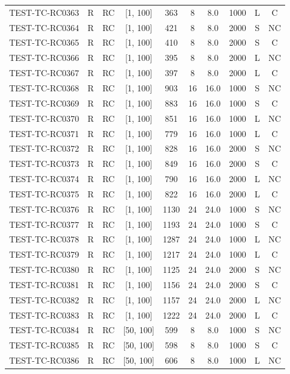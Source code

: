 \begin{longtable}{lccccccccc}
TEST-TC-RC0363 & R & RC & [1, 100] & 363 & 8 & 8.0 & 1000 & L & C \\
TEST-TC-RC0364 & R & RC & [1, 100] & 421 & 8 & 8.0 & 2000 & S & NC \\
TEST-TC-RC0365 & R & RC & [1, 100] & 410 & 8 & 8.0 & 2000 & S & C \\
TEST-TC-RC0366 & R & RC & [1, 100] & 395 & 8 & 8.0 & 2000 & L & NC \\
TEST-TC-RC0367 & R & RC & [1, 100] & 397 & 8 & 8.0 & 2000 & L & C \\
TEST-TC-RC0368 & R & RC & [1, 100] & 903 & 16 & 16.0 & 1000 & S & NC \\
TEST-TC-RC0369 & R & RC & [1, 100] & 883 & 16 & 16.0 & 1000 & S & C \\
TEST-TC-RC0370 & R & RC & [1, 100] & 851 & 16 & 16.0 & 1000 & L & NC \\
TEST-TC-RC0371 & R & RC & [1, 100] & 779 & 16 & 16.0 & 1000 & L & C \\
TEST-TC-RC0372 & R & RC & [1, 100] & 828 & 16 & 16.0 & 2000 & S & NC \\
TEST-TC-RC0373 & R & RC & [1, 100] & 849 & 16 & 16.0 & 2000 & S & C \\
TEST-TC-RC0374 & R & RC & [1, 100] & 790 & 16 & 16.0 & 2000 & L & NC \\
TEST-TC-RC0375 & R & RC & [1, 100] & 822 & 16 & 16.0 & 2000 & L & C \\
TEST-TC-RC0376 & R & RC & [1, 100] & 1130 & 24 & 24.0 & 1000 & S & NC \\
TEST-TC-RC0377 & R & RC & [1, 100] & 1193 & 24 & 24.0 & 1000 & S & C \\
TEST-TC-RC0378 & R & RC & [1, 100] & 1287 & 24 & 24.0 & 1000 & L & NC \\
TEST-TC-RC0379 & R & RC & [1, 100] & 1217 & 24 & 24.0 & 1000 & L & C \\
TEST-TC-RC0380 & R & RC & [1, 100] & 1125 & 24 & 24.0 & 2000 & S & NC \\
TEST-TC-RC0381 & R & RC & [1, 100] & 1156 & 24 & 24.0 & 2000 & S & C \\
TEST-TC-RC0382 & R & RC & [1, 100] & 1157 & 24 & 24.0 & 2000 & L & NC \\
TEST-TC-RC0383 & R & RC & [1, 100] & 1222 & 24 & 24.0 & 2000 & L & C \\
TEST-TC-RC0384 & R & RC & [50, 100] & 599 & 8 & 8.0 & 1000 & S & NC \\
TEST-TC-RC0385 & R & RC & [50, 100] & 598 & 8 & 8.0 & 1000 & S & C \\
TEST-TC-RC0386 & R & RC & [50, 100] & 606 & 8 & 8.0 & 1000 & L & NC \\

\end{longtable}
